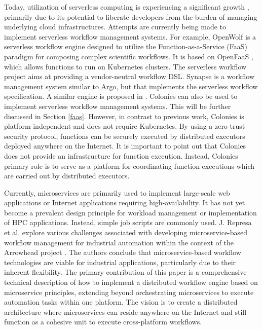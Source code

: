 \documentclass{article}
\begin{document}
Today, utilization of serverless computing is experiencing a significant growth \cite{cognit}, primarily due to its potential to liberate developers from the burden of managing underlying cloud infrastructures. Attempts are currently being made to implement serverless workflow management systems. For example, OpenWolf \cite{openwolf} is a serverless workflow engine designed to utilize the Function-as-a-Service (FaaS) paradigm for composing complex scientific workflows. It is based on OpenFaaS \cite{openfaas}, which allows functions to run on Kubernetes clusters. 
The serverless workflow project \cite{serverlessworkflows} aims at providing a vendor-neutral workflow DSL. Synapse \cite{synapse} is a workflow management system similar to Argo, but that implements the serverless workflow specification. A similar engine is proposed in \cite{scafe}. 
Colonies can also be used to implement serverless workflow management systems. This will be further discussed in Section \ref{faas}. However, in contrast to previous work, Colonies is platform independent and does not require Kubernetes. By using a zero-trust security protocol, functions can be securely executed by distributed executors deployed anywhere on the Internet. It is important to point out that Colonies does not provide an infrastructure for function execution. Instead, Colonies primary role is to serve as a platform for coordinating function executions which are carried out by distributed executors.

Currently, microservices are primarily used to implement large-scale web applications or Internet applications requiring high-availability. It has not yet become a prevalent design principle for workload management or implementation of HPC applications. Instead, simple job scripts are commonly used. J. Represa et al. \cite{GarciaRepresa1740746, GarciaRepresa1640771} explore various challenges associated with developing microservice-based workflow management for industrial automation within the context of the Arrowhead project \cite{delsing2017iot}. The authors conclude that microservice-based workflow technologies are viable for industrial applications, particularly due to their inherent flexibility. The primary contribution of this paper is a comprehensive technical description of how to implement a distributed workflow engine based on microservice principles, extending beyond orchestrating microservices to execute automation tasks within one platform. The vision is to create a distributed architecture where microservices can reside anywhere on the Internet and still function as a cohesive unit to execute cross-platform workflows.  
\end{document}
